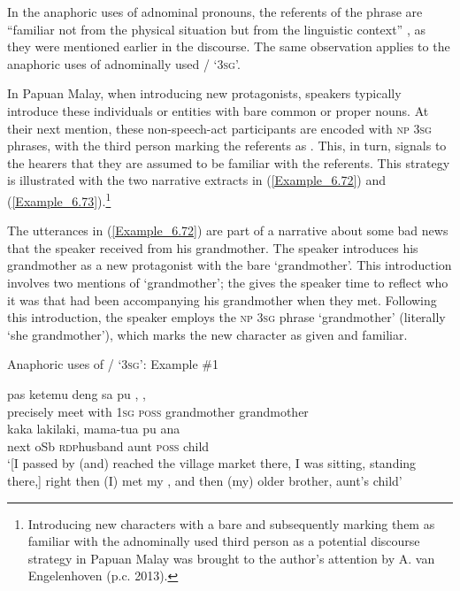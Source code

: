 In the anaphoric uses of adnominal pronouns, the referents of the   phrase are “familiar not from the physical situation but from the linguistic context” {\citep[4]{Lyons.1999}}, as they were mentioned earlier in the discourse. The same observation applies to the anaphoric uses of adnominally used / ‘\textsc{3sg}’.



In Papuan Malay, when introducing new protagonists, speakers typically introduce these individuals or entities with bare common or proper nouns. At their next mention, these non-speech-act participants are encoded with \textsc{np} \textsc{3sg}  phrases, with the third person  marking the referents as . This, in turn, signals to the hearers that they are assumed to be familiar with the referents. This strategy is illustrated with the two narrative extracts in (\ref{Example_6.72}) and (\ref{Example_6.73}).\footnote{Introducing new characters with a bare  and subsequently marking them as familiar with the adnominally used third person  as a potential discourse strategy in Papuan Malay was brought to the author’s attention by A. van Engelenhoven (p.c. 2013).}



The utterances in (\ref{Example_6.72}) are part of a narrative about some bad news that the speaker received from his grandmother. The speaker introduces his grandmother as a new protagonist with the bare   ‘grandmother’. This introduction involves two mentions of  ‘grandmother’; the  gives the speaker time to reflect who it was that had been accompanying his grandmother when they met. Following this introduction, the speaker employs the \textsc{np} \textsc{3sg}  phrase  ‘grandmother’ (literally ‘she grandmother’), which marks the new character as given and familiar.



\begin{styleExampleTitle}
Anaphoric uses of / ‘\textsc{3sg}’: Example \#1
\end{styleExampleTitle}

\ea
\label{Example_6.72}
\gll {\ldots} {{pas}} {ketemu} {{deng}} {sa} {{pu}} {{,}} {,}\\ %
 { }  {precisely}  meet  {with}  \textsc{1sg}  {\textsc{poss}}  {grandmother}  grandmother\\
  kaka  {laki{\Tilde}laki,}  {mama-tua}  {pu}  {ana}\\
 {next}  oSb  {\textsc{rdp}{\Tilde}husband}  {aunt}  {\textsc{poss}}  {child}\\
\glt
‘[I passed by (and) reached the village market there, I was sitting, standing there,] right then (I) met my ,  and then (my) older brother, aunt’s child’\\

